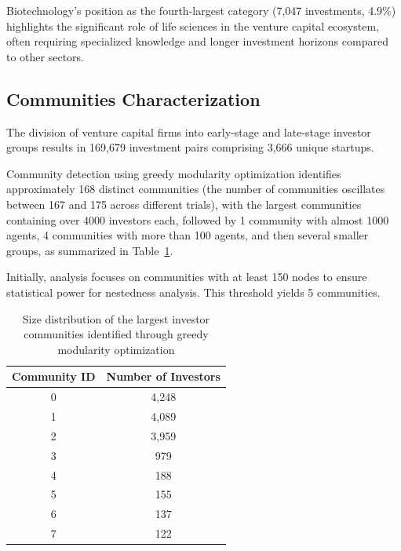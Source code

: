 Biotechnology's position as the fourth-largest category (7,047 investments, 4.9\%) highlights the significant role of life sciences in the venture capital ecosystem, often requiring specialized knowledge and longer investment horizons compared to other sectors.

\subsection{Communities Characterization}

\newcommand{\invPairs}{169,679}
\newcommand{\invPairsUniqueStartups}{3,666}

The division of venture capital firms into early-stage and late-stage investor groups results in \invPairs{} investment pairs comprising \invPairsUniqueStartups{} unique startups.

\newcommand{\numCommunities}{168}
\newcommand{\numTopCommunities}{5}
\newcommand{\numCommunitiesThreshold}{150}

Community detection using greedy modularity optimization identifies approximately \numCommunities{} distinct communities (the number of communities oscillates between 167 and 175 across different trials), with the largest communities containing over 4000 investors each, followed by 1 community with almost 1000 agents, 4 communities with more than 100 agents, and then several smaller groups, as summarized in Table~\ref{tab:community_sizes}.

Initially, analysis focuses on communities with at least \numCommunitiesThreshold{} nodes to ensure statistical power for nestedness analysis. This threshold yields \numTopCommunities{} communities.


\begin{table}[htp]
\centering
\begin{tabular}{|c|c|}
\hline
\textbf{Community ID} & \textbf{Number of Investors} \\
\hline
0 & 4,248 \\
1 & 4,089 \\
2 & 3,959 \\
3 & 979 \\
4 & 188 \\
5 & 155 \\
6 & 137 \\
7 & 122 \\
\hline
\end{tabular}
\caption{Size distribution of the largest investor communities identified through greedy modularity optimization}
\label{tab:community_sizes}
\end{table}

